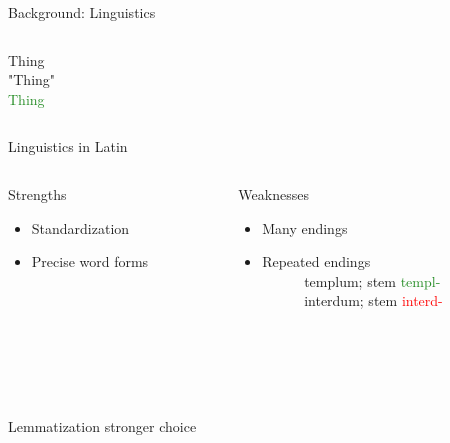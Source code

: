 \documentclass[aspectratio=169,xcolor=dvipsnames]{beamer}
\begin{document}
\begin{frame}[t]{Background: Linguistics}
\begin{columns}
\begin{column}{0.5\textwidth}
\begin{columns}
            \begin{column}{0.5\textwidth}
            \centering
            \large
            Thing \\
            "Thing" \\
           \textcolor{ForestGreen}{Thing}
            \end{column}
        \end{columns}
        \end{column}
    \end{columns} 

\end{frame}

\begin{frame}{Linguistics in Latin}

    \begin{columns}
        \begin{column}[t]{0.5\textwidth}
            {\large Strengths}
        \begin{itemize}
            \item Standardization
            \item Precise word forms
        \end{itemize}
        \end{column}
         \begin{column}[t]{0.5\textwidth}
            {\large Weaknesses}
        \begin{itemize}
            \item Many endings
            \item Repeated endings \\
             \ \ \ \ \ \ templum; stem \textcolor{ForestGreen}{templ-} \\
             \ \ \ \ \ \ interdum; stem \textcolor{red}{interd-}
        \end{itemize}
        \end{column}
    \end{columns}

    \ \\ \ \\ \ \\ \ \\
        
    \centering
    {\large Lemmatization stronger choice}
    
\end{frame}
\end{document}
